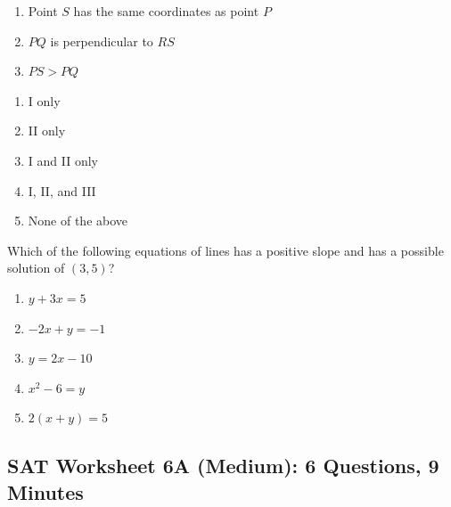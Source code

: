 \documentclass[12pt]{book}
\begin{document}
\begin{multienumerate}
{\begin{enumerate}[label=\Roman*.]
\item Point $S$ has the same coordinates as point $P$
\item $PQ$ is perpendicular to $RS$
\item $PS>PQ$
\end{enumerate}

\begin{enumerate}[label=(\Alph*)]
\item I only
\item II only
\item I and II only
\item I, II, and III
\item None of the above
\end{enumerate}
}

\vfill
{}
{Which of the following equations of lines has a positive slope and has a possible solution of $(3,5)$?

\begin{enumerate}[label=(\Alph*)]
\item $y+3x=5$
\item $-2x+y= -1$
\item $y=2x-10$
\item $x^2-6=y$
\item $2(x+y)=5$
\end{enumerate}}
\end{multienumerate}

\newpage
\subsection{SAT Worksheet 6A (Medium): 6 Questions, 9 Minutes}
\end{document}
